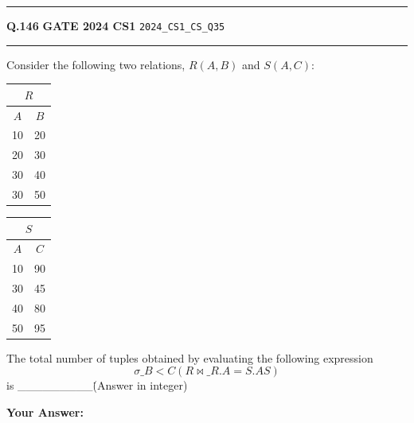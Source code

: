 \documentclass[a4paper,10pt]{article}
\begin{document}
\vspace{6pt}\hrule height 0.35pt\vspace{6pt}
\noindent
\begin{tcolorbox}[
    blanker,
    sidebyside,
    sidebyside align=top,
    lefthand width=0.55\textwidth,
    top=4pt, bottom=4pt, left=0pt, right=0pt,
    middle=16pt,
    underlay={
        \draw[dashed, black!80, line width=0.8pt, dash pattern=on 4pt off 3pt]
            ([xshift=0.55\textwidth+8pt]frame.north west) --
            ([xshift=0.55\textwidth+8pt]frame.south west);
    }
]
\textbf{Q.146}  \hfill {\footnotesize\textbf{GATE 2024 CS1} \quad \tiny\texttt{2024\_CS1\_CS\_Q35}}
\vspace{2pt}\hrule height 0.3pt\vspace{4pt}

Consider the following two relations, $R(A,B)$ and $S(A,C)$:
\begin{center}
\begin{tabular}{|c|c|}
\multicolumn{2}{c}{$R$} \\
\hline
$A$ & $B$ \\
\hline
10 & 20 \\
20 & 30 \\
30 & 40 \\
30 & 50 \\
\hline
\end{tabular}
\qquad
\begin{tabular}{|c|c|}
\multicolumn{2}{c}{$S$} \\
\hline
$A$ & $C$ \\
\hline
10 & 90 \\
30 & 45 \\
40 & 80 \\
50 & 95 \\
\hline
\end{tabular}
\end{center}
The total number of tuples obtained by evaluating the following expression
\[ \sigma\_{B < C}(R \bowtie\_{R.A = S.A} S) \]
is \_\_\_\_\_\_\_\_\_\. (Answer in integer)

\par\vspace{6pt}\noindent\textbf{Your Answer:} \fbox{\rule{0pt}{1.3ex}\hspace{3cm}}

\tcblower


\end{tcolorbox}
\end{document}
